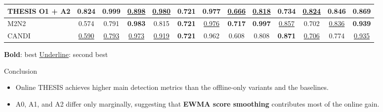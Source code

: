 \documentclass[aspectratio=169]{beamer}
\begin{document}
\begin{frame}
{\begin{tabular}{lcccccccccccc}
        THESIS O1 + A2
        & \textbf{0.824} & \textbf{0.999} & \underline{0.898}
        & \underline{0.980} & \textbf{0.721} & 0.977
        & \underline{0.666} & \underline{0.818} & 0.734
        & \underline{0.824} & \textbf{0.846} & 0.869 \\

        \midrule

        M2N2
        & 0.574 & 0.791 & \textbf{0.983}
        & 0.815 & \textbf{0.721} & \underline{0.976}
        & \textbf{0.717} & \textbf{0.997} & \underline{0.857}
        & 0.702 & \underline{0.836} & \textbf{0.939} \\

        CANDI
        & \underline{0.590} & \underline{0.793} & \underline{0.973}
        & \underline{0.919} & \textbf{0.721} & 0.962
        & 0.608 & 0.808 & \textbf{0.871}
        & \underline{0.706} & 0.774 & \underline{0.935} \\

        \bottomrule
    \end{tabular}%
    }

    \vspace{0.1em}

    \scriptsize
    \textbf{Bold}: best
    \qquad
    \underline{Underline}: second best

    \vspace{-0.25em}

    \begin{exampleblock}{Conclusion}
        \scriptsize
        \begin{itemize}
            \setlength{\itemsep}{0.05em}
            \item Online THESIS achieves higher main detection metrics
                  than the offline-only variants and the baselines.
            \item A0, A1, and A2 differ only marginally,
                  suggesting that \textbf{EWMA score smoothing}
                  contributes most of the online gain.
        \end{itemize}
    \end{exampleblock}

\end{frame}
\end{document}
